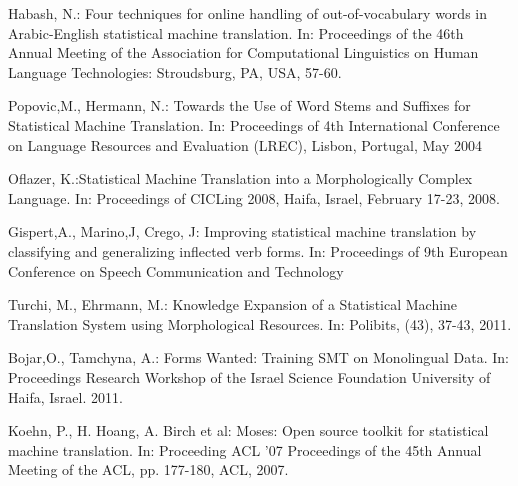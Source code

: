 \documentclass[11pt,letterpaper]{article}
\begin{document}
\begin{thebibliography}{4} 


 Habash, N.: Four techniques for online handling of out-of-vocabulary words in 
Arabic-English statistical machine translation. In: Proceedings of the 46th Annual Meeting of 
the Association for Computational Linguistics on Human Language Technologies:
Stroudsburg, PA, USA, 57-60.

 Popovic,M., Hermann, N.: Towards the Use of Word Stems and Suffixes for Statistical Machine Translation. 
In: Proceedings of 4th International Conference on Language Resources and Evaluation (LREC), Lisbon, Portugal, May 2004 

 Oflazer, K.:Statistical Machine Translation into a Morphologically Complex Language. 
In: Proceedings of CICLing 2008, Haifa, Israel, February 17-23, 2008. 

 Gispert,A., Marino,J, Crego, J: Improving statistical machine translation by classifying and generalizing inflected verb forms.  
In: Proceedings of 9th European Conference on Speech Communication and Technology

 Turchi, M., Ehrmann, M.: Knowledge Expansion of a Statistical Machine Translation System using Morphological Resources. 
In: Polibits, (43), 37-43, 2011.

 Bojar,O., Tamchyna, A.: Forms Wanted: Training SMT on Monolingual Data.
In: Proceedings Research Workshop of the Israel Science Foundation University of Haifa, Israel. 2011.

Koehn, P., H. Hoang, A. Birch et al: Moses: Open source toolkit for statistical machine translation.
In: Proceeding ACL '07 Proceedings of the 45th Annual Meeting of the ACL, pp. 177-180, ACL, 2007.

\end{thebibliography}
\end{document}
